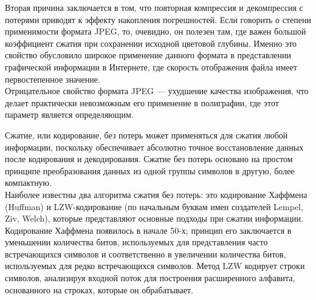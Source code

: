 \documentclass{beamer}
\begin{document}
Вторая причина заключается в том, что повторная компрессия и декомпрессия с потерями приводят к эффекту накопления погрешностей. Если говорить о степени применимости формата JPEG, то, очевидно, он полезен там, где важен большой коэффициент сжатия при сохранении исходной цветовой глубины. Именно это свойство обусловило широкое применение данного формата в представлении графической информации в Интернете, где скорость отображения файла имеет первостепенное значение.\\
Отрицательное свойство формата JPEG — ухудшение качества изображения, что делает практически невозможным его применение в полиграфии, где этот параметр является определяющим.\\
\newpage
\begin{frame}
Сжатие, или кодирование, без потерь может применяться для сжатия любой информации, поскольку обеспечивает абсолютно точное восстановление данных после кодирования и декодирования. Сжатие без потерь основано на простом принципе преобразования данных из одной группы символов в другую, более компактную.\\

Наиболее известны два алгоритма сжатия без потерь: это кодирование Хаффмена (Huffman) и LZW-кодирование (по начальным буквам имен создателей Lempel, Ziv, Welch), которые представляют основные подходы при сжатии информации. Кодирование Хаффмена появилось в начале 50-х; принцип его заключается в уменьшении количества битов, используемых для представления часто встречающихся символов и соответственно в увеличении количества битов, используемых для редко встречающихся символов. Метод LZW кодирует строки символов, анализируя входной поток для построения расширенного алфавита, основанного на строках, которые он обрабатывает.
\end{frame}
\end{document}
